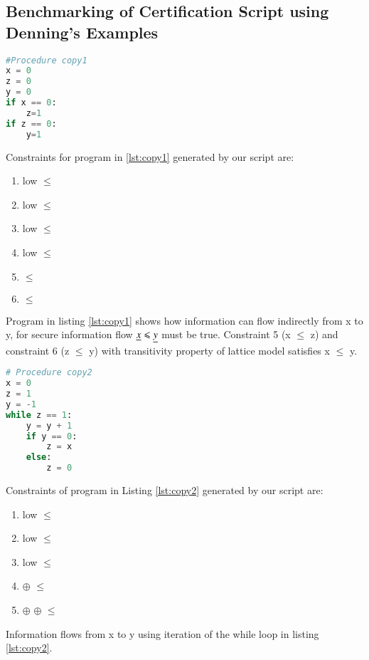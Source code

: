 \subsection{Benchmarking of Certification Script using Denning's Examples \cite{denning}}
\begin{lstlisting}[language=Python, caption=Python version of copy1 example in \cite{denning}. goal: information flow from x to y, label={lst:copy1} ]
#Procedure copy1
x = 0
z = 0
y = 0
if x == 0:
	z=1
if z == 0:
	y=1
\end{lstlisting}
Constraints for program in \ref{lst:copy1} generated by our script are:\\
\begin{enumerate}
	\item low $\leqslant$ 
	\item low $\leqslant$ 
	\item low $\leqslant$ 
	\item low $\leqslant$ 
	\item {} $\leqslant$ 
	\item {} $\leqslant$ 
\end{enumerate}
Program in listing \ref{lst:copy1} shows how  information can flow indirectly from x to y, for secure information flow $ \underline{x} \leqslant \underline{y} $ must be true. Constraint 5 (x $\leqslant$ z) and constraint 6 (z $\leqslant$ y) with transitivity property of lattice model satisfies x $\leqslant$ y.  \\
\begin{lstlisting}[language=Python, caption=Python version of copy2 example in \cite{denning}. goal: information flow from x to y, label={lst:copy2} ]
# Procedure copy2
x = 0
z = 1
y = -1
while z == 1:
	y = y + 1
	if y == 0:
		z = x
	else:
		z = 0
\end{lstlisting}
Constraints of program in Listing \ref{lst:copy2} generated by our script are:\\
\begin{enumerate}
\item low $\leqslant$ 
\item low $\leqslant$ 
\item low $\leqslant$ 
\item {} $\oplus$  $\leqslant$ 
\item {} $\oplus$  $\oplus$  $\leqslant$ 	
\end{enumerate}
Information flows from x to y using iteration of the while loop in listing \ref{lst:copy2}.
